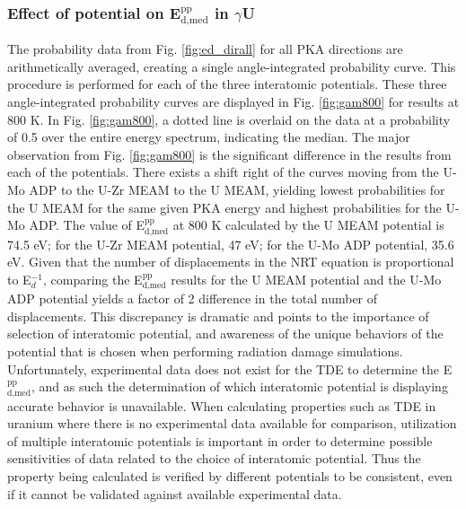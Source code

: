\documentclass[review]{elsarticle}
\begin{document}
\FloatBarrier

\subsubsection{Effect of potential on E$^{\textrm{pp}}_{\textrm{d,med}}$ in $\gamma$U}

The probability data from Fig. \ref{fig:ed_dirall} for all PKA directions are arithmetically averaged, creating a single angle-integrated probability curve. This procedure is performed for each of the three interatomic potentials. These three angle-integrated probability curves are displayed in Fig. \ref{fig:gam800} for results at 800 K. In Fig. \ref{fig:gam800}, a dotted line is overlaid on the data at a probability of 0.5 over the entire energy spectrum, indicating the median. The major observation from Fig. \ref{fig:gam800} is the significant difference in the results from each of the potentials. There exists a shift right of the curves moving from the U-Mo ADP to the U-Zr MEAM to the U MEAM, yielding lowest probabilities for the U MEAM for the same given PKA energy and highest probabilities for the U-Mo ADP. The value of E$^{\textrm{pp}}_{\textrm{d,med}}$ at 800 K calculated by the U MEAM potential is 74.5 eV; for the U-Zr MEAM potential, 47 eV; for the U-Mo ADP potential, 35.6 eV. Given that the number of displacements in the NRT equation \cite{norgett1975} is proportional to E$_{d}^{-1}$, comparing the E$^{\textrm{pp}}_{\textrm{d,med}}$ results for the U MEAM potential and the U-Mo ADP potential yields a factor of 2 difference in the total number of displacements. This discrepancy is dramatic and points to the importance of selection of interatomic potential, and awareness of the unique behaviors of the potential that is chosen when performing radiation damage simulations. Unfortunately, experimental data does not exist for the TDE to determine the E$^{\textrm{pp}}_{\textrm{d,med}}$, and as such the determination of which interatomic potential is displaying accurate behavior is unavailable. When calculating properties such as TDE in uranium where there is no experimental data available for comparison, utilization of multiple interatomic potentials is important in order to determine possible sensitivities of data related to the choice of interatomic potential. Thus the property being calculated is verified by different potentials to be consistent, even if it cannot be validated against available experimental data.
\end{document}
